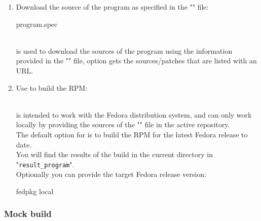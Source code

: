 \begin{enumerate}
\item Download the source of the program as specified in the "" file:
\begin{scripti}
\fprompt{~}   program.spec
\end{scripti}
\\[-0.75cm]
\noindent {} is used to download the sources of the program using the information provided in the "" file, 
 option gets the sources/patches that are listed with an URL. \\
\item Use  to build the RPM: 
\begin{scripti}
\fprompt{~}  
\end{scripti}
\\[-0.75cm]
 is intended to work with the Fedora distribution system, and can only work locally by providing the sources of the "" file in the active repository. \\ 
The default option for  is to build the RPM for the latest Fedora release to date. \\
You will find the results of the build in the current directory in "\texttt{result\_program}". \\[0.25cm]
Optionally you can provide the target Fedora release version:\\[-0.75cm]
\begin{scripti}
\fprompt{~} fedpkg   local
\end{scripti}
\end{enumerate}

\subsubsection{Mock build}
\label{mock}


